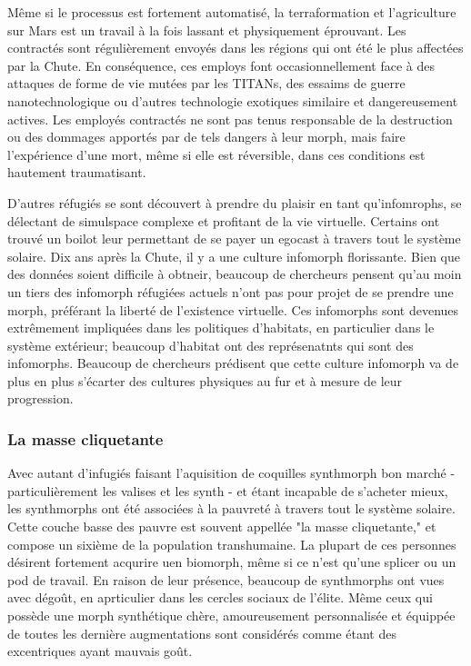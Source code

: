 Même si le processus est fortement automatisé, la terraformation et l'agriculture sur Mars est un travail à la fois lassant et physiquement éprouvant. Les contractés sont régulièrement envoyés dans les régions qui ont été le plus affectées par la Chute. En conséquence, ces employs font occasionnellement face à des attaques de forme de vie mutées par les TITANs, des essaims de guerre nanotechnologique ou d'autres technologie exotiques similaire et dangereusement actives. Les employés contractés ne sont pas tenus responsable de la destruction ou des dommages apportés par de tels dangers à leur morph, mais faire l'expérience d'une mort, même si elle est réversible, dans ces conditions est hautement traumatisant. 

D'autres réfugiés se sont découvert à prendre du plaisir en tant qu'infomrophs, se délectant de simulspace complexe et profitant de la vie virtuelle. Certains ont trouvé un boilot leur permettant de se payer un egocast à travers tout le système solaire. Dix ans après la Chute, il y a une culture infomorph florissante. Bien que des données soient difficile à obtneir, beaucoup de chercheurs pensent qu'au moin un tiers des infomorph réfugiées actuels n'ont pas pour projet de se prendre une morph, préférant la liberté de l'existence virtuelle. Ces infomorphs sont devenues extrêmement impliquées dans les politiques d'habitats, en particulier dans le système extérieur; beaucoup d'habitat ont des représenatnts qui sont des infomorphs. Beaucoup de chercheurs prédisent que cette culture infomorph va de plus en plus s'écarter des cultures physiques au fur et à mesure de leur progression. 

\subsubsection{La masse cliquetante} \label{sec:clanking-masses} 

Avec autant d'infugiés faisant l'aquisition de coquilles synthmorph bon marché - particulièrement les valises et les synth - et étant incapable de s'acheter mieux, les synthmorphs ont été associées à la pauvreté à travers tout le système solaire. Cette couche basse des pauvre est souvent appellée "la masse cliquetante," et compose un sixième de la population transhumaine. La plupart de ces personnes désirent fortement acqurire uen biomorph, même si ce n'est qu'une splicer ou un pod de travail. En raison de leur présence, beaucoup de synthmorphs ont vues avec dégoût, en aprticulier dans les cercles sociaux de l'élite. Même ceux qui possède une morph synthétique chère, amoureusement personnalisée et équippée de toutes les dernière augmentations sont considérés comme étant des excentriques ayant mauvais goût. 

